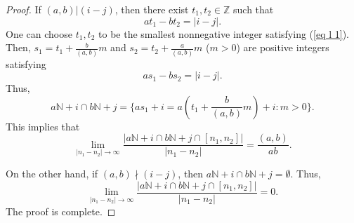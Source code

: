 \documentclass{amsart}
\theoremstyle{definition}
\numberwithin{equation}{section}%
\begin{document}
\begin{proof}
    If $(a,b)|(i-j)$, then there exist $t_1,t_2\in\mathbb{Z}$ such that
    \begin{equation}\label{eq l 1}
        at_1-bt_2=|i-j|.
    \end{equation}
    One can choose $t_1,t_2$ to be the smallest nonnegative integer satisfying (\ref{eq l 1}). Then, $s_1=t_1+\frac{b}{(a,b)} m$ and $s_2=t_2+\frac{a}{(a,b)} m$ ($m> 0$) are positive integers satisfying 
    \begin{equation*}
        as_1-bs_2=|i-j|.
    \end{equation*}
    Thus,
    \begin{equation*}
        a\mathbb{N}+i\cap b\mathbb{N}+j=\{as_1+i=a(t_1+\frac{b}{(a,b)}m)+i:  m>0\}.
    \end{equation*}
    This implies that
    \begin{equation*}
         \lim_{|n_1-n_2|\to\infty}\frac{|a\mathbb{N}+i\cap b\mathbb{N}+j\cap [n_1,n_2]|}{|n_1-n_2|}=\frac{(a,b)}{ab}.
    \end{equation*}

    On the other hand, if $(a,b)\nmid(i-j)$, then $a\mathbb{N}+i\cap b\mathbb{N}+j=\emptyset$. Thus,
     \begin{equation*}
         \lim_{|n_1-n_2|\to\infty}\frac{|a\mathbb{N}+i\cap b\mathbb{N}+j\cap [n_1,n_2]|}{|n_1-n_2|}=0.
    \end{equation*}
    The proof is complete.
\end{proof}
\end{document}
